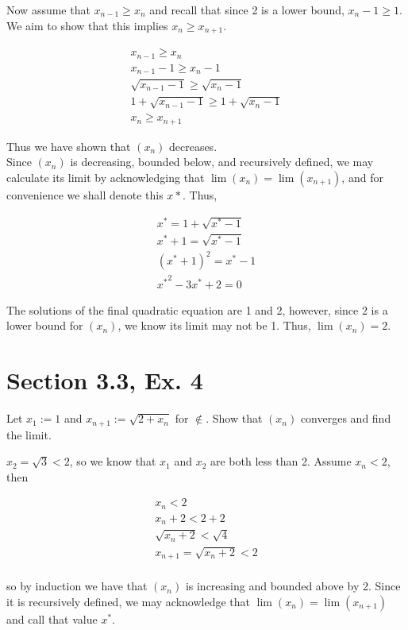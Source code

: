 \documentclass[paper=a4, fontsize=11pt]{scrartcl} %
\numberwithin{equation}{section} %
\numberwithin{figure}{section} %
\numberwithin{table}{section} %
\begin{document}
Now assume that $x_{n-1} \geq x_n$ and recall that since 2 is a lower bound, $x_n - 1 \geq 1$. We aim to show that this implies $x_n \geq x_{n+1}$.

\begin{gather*}
x_{n-1} \geq x_n\\
x_{n-1} - 1 \geq x_n - 1\\
\sqrt{x_{n-1} - 1} \geq \sqrt{x_n - 1}\\
1 + \sqrt{x_{n-1} - 1} \geq 1 + \sqrt{x_n - 1}\\
x_n \geq x_{n+1}
\end{gather*}

Thus we have shown that $(x_n)$ decreases.\\

Since $(x_n)$ is decreasing, bounded below, and recursively defined, we may calculate its limit by acknowledging that $\lim(x_n) = \lim(x_{n+1})$, and for convenience we shall denote this $x*$. Thus,

\begin{gather*}
x^* = 1 + \sqrt{x^* - 1}\\
x^* + 1 = \sqrt{x^* - 1}\\
(x^* + 1)^2 = x^* - 1\\
{x^*}^2 - 3x^* + 2 = 0
\end{gather*}

The solutions of the final quadratic equation are 1 and 2, however, since 2 is a lower bound for $(x_n)$, we know its limit may not be 1. Thus, $\lim(x_n) = 2$.\done

\section*{Section 3.3, Ex. 4}

Let $x_1 := 1$ and $x_{n+1} := \sqrt{2 + x_n}$ for $\nin$. Show that $(x_n)$ converges and find the limit.

\pf $x_2 = \sqrt{3} < 2$, so we know that $x_1$ and $x_2$ are both less than 2. Assume $x_n < 2$, then

\begin{gather*}
x_n < 2\\
x_n + 2< 2 + 2\\
\sqrt{x_n + 2} < \sqrt{4}\\
x_{n+1} = \sqrt{x_n + 2} < 2\\
\end{gather*}

so by induction we have that $(x_n)$ is increasing and bounded above by 2. Since it is recursively defined, we may acknowledge that $\lim(x_n) = \lim(x_{n+1})$ and call that value $x^*$.
\end{document}
